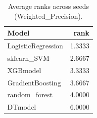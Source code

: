\begin{table}[t]
\centering
\begin{tabular}{lr}
\toprule
Model & rank \\
\midrule
LogisticRegression & 1.3333 \\
sklearn_SVM & 2.6667 \\
XGBmodel & 3.3333 \\
GradientBoosting & 3.6667 \\
random_forest & 4.0000 \\
DTmodel & 6.0000 \\
\bottomrule
\end{tabular}
\caption{Average ranks across seeds (Weighted_Precision).}
\label{tab:avg_rank_Weighted_Precision}
\end{table}